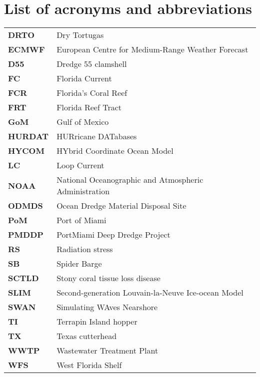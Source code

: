 
\chapter*{List of acronyms and abbreviations}

\begingroup
\setlength{\tabcolsep}{20pt}
\renewcommand{\arraystretch}{1.3}
\begin{tabular}{ll}
	\textbf{DRTO}   & Dry Tortugas \\
	\textbf{ECMWF}  & European Centre for Medium-Range Weather Forecast \\
	\textbf{D55}    & Dredge 55 clamshell \\
	\textbf{FC}     & Florida Current \\
	\textbf{FCR}    & Florida's Coral Reef \\
	\textbf{FRT}    & Florida Reef Tract  \\
	\textbf{GoM}    & Gulf of Mexico \\
	\textbf{HURDAT} & HURricane DATabases \\
	\textbf{HYCOM}  & HYbrid Coordinate Ocean Model \\
	\textbf{LC}     & Loop Current \\
	\textbf{NOAA}   & National Oceanographic and Atmospheric Administration \\
	\textbf{ODMDS}	& Ocean Dredge Material Disposal Site \\
	\textbf{PoM}    & Port of Miami \\
	\textbf{PMDDP}  & PortMiami Deep Dredge Project \\
	\textbf{RS}     & Radiation stress \\
	\textbf{SB}     & Spider Barge \\
	\textbf{SCTLD}  & Stony coral tissue loss disease \\
	\textbf{SLIM}   & Second-generation Louvain-la-Neuve Ice-ocean Model\\
	\textbf{SWAN}   & Simulating WAves Nearshore \\
	\textbf{TI}     & Terrapin Island hopper \\
	\textbf{TX}     & Texas cutterhead \\
	\textbf{WWTP}	& Wastewater Treatment Plant \\
	\textbf{WFS}    & West Florida Shelf
\end{tabular}
\endgroup